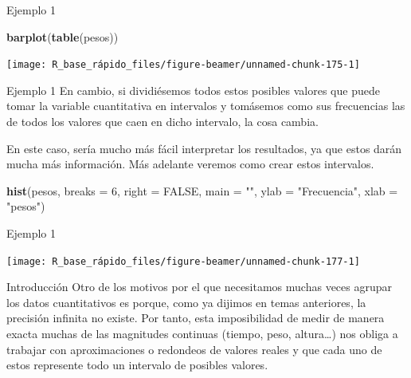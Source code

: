 \documentclass[
  ignorenonframetext,
  aspectratio=169]{beamer}
\newenvironment{Shaded}{\begin{snugshade}}{\end{snugshade}}
\newcommand{\AttributeTok}[1]{\textcolor[rgb]{0.13,0.29,0.53}{#1}}
\newcommand{\ConstantTok}[1]{\textcolor[rgb]{0.56,0.35,0.01}{#1}}
\newcommand{\DecValTok}[1]{\textcolor[rgb]{0.00,0.00,0.81}{#1}}
\newcommand{\FunctionTok}[1]{\textcolor[rgb]{0.13,0.29,0.53}{\textbf{#1}}}
\newcommand{\NormalTok}[1]{#1}
\newcommand{\StringTok}[1]{\textcolor[rgb]{0.31,0.60,0.02}{#1}}
\begin{document}
\begin{frame}[fragile]{Ejemplo 1}
\label{ejemplo-1-9}
\begin{Shaded}
\begin{Highlighting}[]
\FunctionTok{barplot}\NormalTok{(}\FunctionTok{table}\NormalTok{(pesos))}
\end{Highlighting}
\end{Shaded}

\begin{center}\texttt{[image: R\_base\_rápido\_files/figure-beamer/unnamed-chunk-175-1]} \end{center}
\end{frame}

\begin{frame}[fragile]{Ejemplo 1}
\label{ejemplo-1-10}
En cambio, si dividiésemos todos estos posibles valores que puede tomar
la variable cuantitativa en intervalos y tomásemos como sus frecuencias
las de todos los valores que caen en dicho intervalo, la cosa cambia.

En este caso, sería mucho más fácil interpretar los resultados, ya que
estos darán mucha más información. Más adelante veremos como crear estos
intervalos.

\begin{Shaded}
\begin{Highlighting}[]
\FunctionTok{hist}\NormalTok{(pesos, }\AttributeTok{breaks =} \DecValTok{6}\NormalTok{, }\AttributeTok{right =} \ConstantTok{FALSE}\NormalTok{, }\AttributeTok{main =} \StringTok{""}\NormalTok{, }\AttributeTok{ylab =} \StringTok{"Frecuencia"}\NormalTok{, }\AttributeTok{xlab =} \StringTok{"pesos"}\NormalTok{)}
\end{Highlighting}
\end{Shaded}
\end{frame}

\begin{frame}{Ejemplo 1}
\label{ejemplo-1-11}
\begin{center}\texttt{[image: R\_base\_rápido\_files/figure-beamer/unnamed-chunk-177-1]} \end{center}
\end{frame}

\begin{frame}{Introducción}
\label{introducciuxf3n-2}
Otro de los motivos por el que necesitamos muchas veces agrupar los
datos cuantitativos es porque, como ya dijimos en temas anteriores, la
precisión infinita no existe. Por tanto, esta imposibilidad de medir de
manera exacta muchas de las magnitudes continuas (tiempo, peso,
altura\ldots) nos obliga a trabajar con aproximaciones o redondeos de
valores reales y que cada uno de estos represente todo un intervalo de
posibles valores.
\end{frame}
\end{document}
